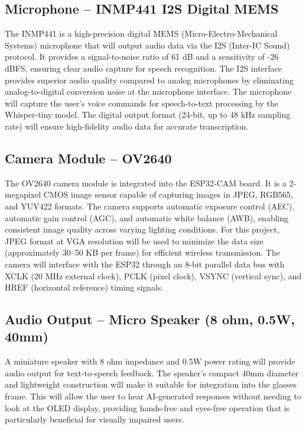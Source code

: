\subsection{Microphone -- INMP441 I2S Digital MEMS}
The INMP441 is a high-precision digital MEMS (Micro-Electro-Mechanical Systems) microphone that will output audio data via the I2S (Inter-IC Sound) protocol. It provides a signal-to-noise ratio of 61 dB and a sensitivity of -26 dBFS, ensuring clear audio capture for speech recognition. The I2S interface provides superior audio quality compared to analog microphones by eliminating analog-to-digital conversion noise at the microphone interface. The microphone will capture the user's voice commands for speech-to-text processing by the Whisper-tiny model. The digital output format (24-bit, up to 48 kHz sampling rate) will ensure high-fidelity audio data for accurate transcription.

\subsection{Camera Module -- OV2640}
The OV2640 camera module is integrated into the ESP32-CAM board. It is a 2-megapixel CMOS image sensor capable of capturing images in JPEG, RGB565, and YUV422 formats. The camera supports automatic exposure control (AEC), automatic gain control (AGC), and automatic white balance (AWB), enabling consistent image quality across varying lighting conditions. For this project, JPEG format at VGA resolution will be used to minimize the data size (approximately 30--50 KB per frame) for efficient wireless transmission. The camera will interface with the ESP32 through an 8-bit parallel data bus with XCLK (20 MHz external clock), PCLK (pixel clock), VSYNC (vertical sync), and HREF (horizontal reference) timing signals.

\subsection{Audio Output -- Micro Speaker (8 ohm, 0.5W, 40mm)}
A miniature speaker with 8 ohm impedance and 0.5W power rating will provide audio output for text-to-speech feedback. The speaker's compact 40mm diameter and lightweight construction will make it suitable for integration into the glasses frame. This will allow the user to hear AI-generated responses without needing to look at the OLED display, providing hands-free and eyes-free operation that is particularly beneficial for visually impaired users.

